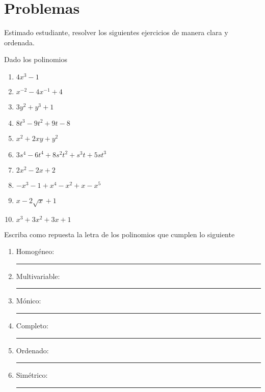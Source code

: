 \section*{\large Problemas}

\vspace{-3mm}

Estimado estudiante, resolver los siguientes ejercicios de manera clara y ordenada.

\begin{exercise}
    Dado los polinomios
    \begin{multicols}{2}
        \begin{enumerate}
            \item $4x^3 - 1$
            \item $x^{-2} - 4x^{-1} + 4$
            \item $3y^2 + y^3 + 1$
            \item $8t^3 - 9t^2 + 9t - 8$
            \item $x^2 + 2xy + y^2$
            \item $3s^4 - 6t^4 + 8 s^{2} t^{2} + s^{3} t + 5 st^{3} $
            \item $2x^2 - 2x + 2$
            \item $-x^3 - 1 + x^4 - x^2 + x - x^5$
            \item $x - 2\sqrt{x} + 1$
            \item $x^3 + 3x^2 + 3x + 1$
        \end{enumerate}
    \end{multicols}
    \vspace{-5mm}
    Escriba como repuesta la letra de los polinomios que cumplen lo siguiente
    \begin{multicols}{3}
        \begin{enumerate}
            \item Homogéneo: \rule{1.5cm}{0.1mm}
            \item Multivariable: \rule{1.3cm}{0.1mm}
            \item Mónico: \rule{1.5cm}{0.1mm}
            \item Completo: \rule{1.5cm}{0.1mm}
            \item Ordenado: \rule{1.5cm}{0.1mm}
            \item Simétrico: \rule{1.5cm}{0.1mm}
        \end{enumerate}
    \end{multicols}
\end{exercise}

